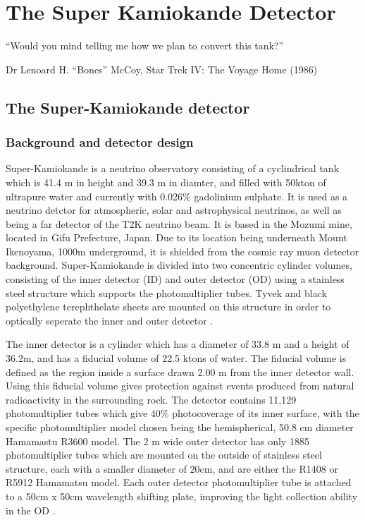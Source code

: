 \chapter{The Super Kamiokande Detector}
\epigraph{``Would you mind telling me how we plan to convert this tank?''}{Dr Lenoard H. ``Bones'' McCoy, Star Trek IV: The Voyage Home (1986)  }
\label{chp:superk}



\section{The Super-Kamiokande detector}

\subsection{Background and detector design}

Super-Kamiokande is a neutrino observatory consisting of a cyclindrical tank which is 41.4 m in height and 39.3 m in diamter, and filled with 50kton of ultrapure water and currently with 0.026\% gadolinium sulphate. It is used as a neutrino detctor for atmospheric, solar and astrophysical neutrinos, as well as being a far detector of the T2K neutrino beam. It is based in the Mozumi mine, located in Gifu Prefecture, Japan. Due to its location being underneath Mount Ikenoyama, 1000m underground, it is shielded from the cosmic ray muon detector background. Super-Kamiokande is divided into two concentric cylinder volumes, consisting of the inner detector (ID) and outer detector (OD) using a stainless steel structure which supports the photomultiplier tubes. Tyvek and black polyethylene terephthelate sheets are mounted on this structure in order to optically seperate the inner and outer detector \cite{suzuki_super-kamiokande_2019}.

The inner detector is a cylinder which has a diameter of 33.8 m and a height of 36.2m, and has a fiducial volume of 22.5 ktons of water. The fiducial volume is defined as the region inside a surface drawn 2.00 m from the inner detector wall. Using this fiducial volume gives protection against events produced from natural radioactivity in the surrounding rock. The detector contains 11,129 photomultiplier tubes which give 40\% photocoverage of its inner surface, with the specific photomultiplier model chosen being the hemispherical, 50.8 cm diameter Hamamastu R3600 model. The 2 m wide outer detector has only 1885 photomultiplier tubes which are mounted on the outside of stainless steel structure, each with a smaller diameter of 20cm, and are either the R1408 or R5912 Hamamatsu model. Each outer detector photomultiplier tube is attached to a 50cm x 50cm wavelength shifting plate, improving the light collection ability in the OD \cite{fukuda_super-kamiokande_2003}.

